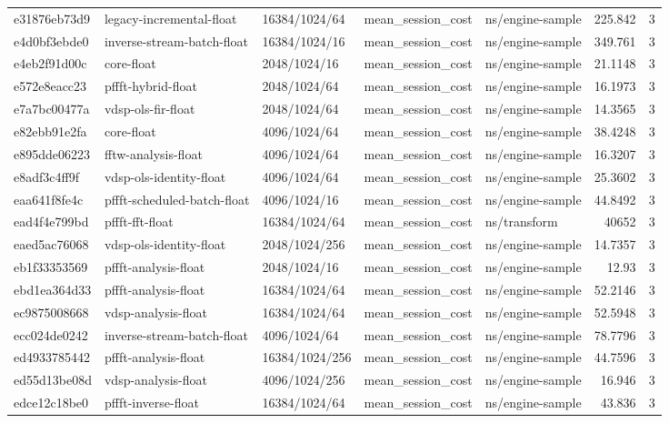 \begin{longtable}{lllllrr}
e31876eb73d9 & legacy-incremental-float & 16384/1024/64 & mean\_session\_cost & ns/engine-sample & 225.842 & 3 \\
e4d0bf3ebde0 & inverse-stream-batch-float & 16384/1024/16 & mean\_session\_cost & ns/engine-sample & 349.761 & 3 \\
e4eb2f91d00c & core-float & 2048/1024/16 & mean\_session\_cost & ns/engine-sample & 21.1148 & 3 \\
e572e8eacc23 & pffft-hybrid-float & 2048/1024/64 & mean\_session\_cost & ns/engine-sample & 16.1973 & 3 \\
e7a7bc00477a & vdsp-ols-fir-float & 2048/1024/64 & mean\_session\_cost & ns/engine-sample & 14.3565 & 3 \\
e82ebb91e2fa & core-float & 4096/1024/64 & mean\_session\_cost & ns/engine-sample & 38.4248 & 3 \\
e895dde06223 & fftw-analysis-float & 4096/1024/64 & mean\_session\_cost & ns/engine-sample & 16.3207 & 3 \\
e8adf3c4ff9f & vdsp-ols-identity-float & 4096/1024/64 & mean\_session\_cost & ns/engine-sample & 25.3602 & 3 \\
eaa641f8fe4c & pffft-scheduled-batch-float & 4096/1024/16 & mean\_session\_cost & ns/engine-sample & 44.8492 & 3 \\
ead4f4e799bd & pffft-fft-float & 16384/1024/64 & mean\_session\_cost & ns/transform & 40652 & 3 \\
eaed5ac76068 & vdsp-ols-identity-float & 2048/1024/256 & mean\_session\_cost & ns/engine-sample & 14.7357 & 3 \\
eb1f33353569 & pffft-analysis-float & 2048/1024/16 & mean\_session\_cost & ns/engine-sample & 12.93 & 3 \\
ebd1ea364d33 & pffft-analysis-float & 16384/1024/64 & mean\_session\_cost & ns/engine-sample & 52.2146 & 3 \\
ec9875008668 & vdsp-analysis-float & 16384/1024/64 & mean\_session\_cost & ns/engine-sample & 52.5948 & 3 \\
ecc024de0242 & inverse-stream-batch-float & 4096/1024/64 & mean\_session\_cost & ns/engine-sample & 78.7796 & 3 \\
ed4933785442 & pffft-analysis-float & 16384/1024/256 & mean\_session\_cost & ns/engine-sample & 44.7596 & 3 \\
ed55d13be08d & vdsp-analysis-float & 4096/1024/256 & mean\_session\_cost & ns/engine-sample & 16.946 & 3 \\
edce12c18be0 & pffft-inverse-float & 16384/1024/64 & mean\_session\_cost & ns/engine-sample & 43.836 & 3 \\

\end{longtable}
